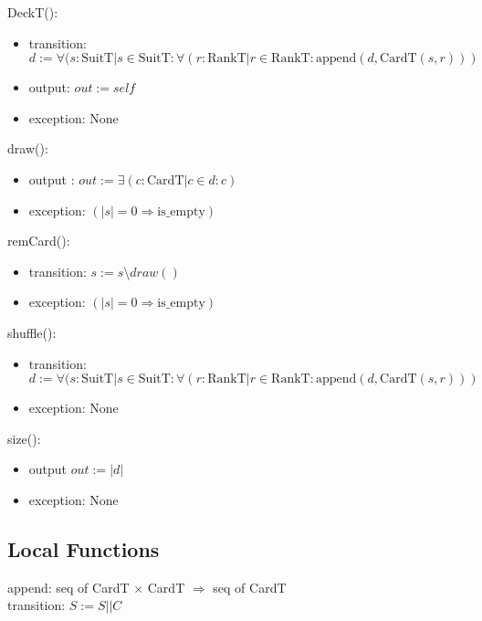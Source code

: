 \documentclass[12pt]{article}
\newcommand{\means}{\Rightarrow}
\begin{document}
DeckT():
\begin{itemize}
    \item transition: $d := \forall (s : \mbox{SuitT} | s \in \mbox{SuitT} : \forall (r : \mbox{RankT} | r \in \mbox{RankT} : \mbox{append}(d,\mbox{CardT}(s,r)))$
    \item output: $out := \mathit{self}$
    \item exception: None
\end{itemize}

\noindent draw():
\begin{itemize}
    \item output : $out := \exists(c : \mbox{CardT} | c \in d : c)$
    \item exception: $(|s| = 0 \means \mbox{is\_empty})$
\end{itemize}

\noindent remCard():
\begin{itemize}
  \item transition: $s := s $\textbackslash$ draw()$
  \item exception: $(|s| = 0 \means \mbox{is\_empty})$
\end{itemize}

\noindent shuffle():
\begin{itemize}
    \item transition: $d := \forall (s : \mbox{SuitT} | s \in \mbox{SuitT} : \forall (r : \mbox{RankT} | r \in \mbox{RankT} : \mbox{append}(d,\mbox{CardT}(s,r)))$
    \item exception: None
\end{itemize}

\noindent size():
\begin{itemize}
    \item output $out := |d|$
    \item exception: None
\end{itemize}

\subsection*{Local Functions}

\noindent append: seq of CardT $\times$ CardT $\means$ seq of CardT\\
\noindent transition: $S := S||C$

\newpage
\end{document}
